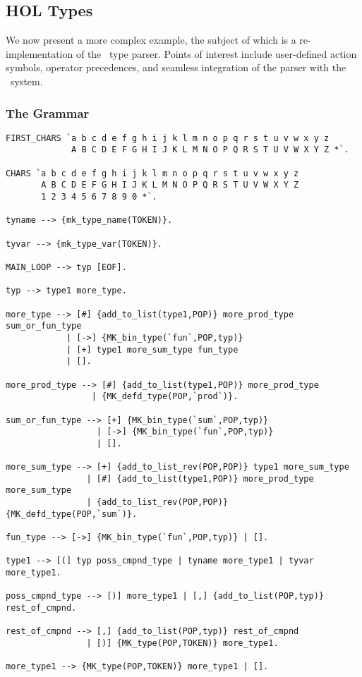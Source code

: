 \subsection{HOL Types}

We now present a more complex example, the subject of which is a 
re-implementation of the \HOL\ type parser.  Points of interest include
user-defined action symbols,
operator precedences,
and seamless integration of the parser with the \HOL\ system.

\subsubsection{The Grammar}

\begin{center}
\begin{boxed}
\begin{verbatim}
FIRST_CHARS `a b c d e f g h i j k l m n o p q r s t u v w x y z 
             A B C D E F G H I J K L M N O P Q R S T U V W X Y Z *`.

CHARS `a b c d e f g h i j k l m n o p q r s t u v w x y z 
       A B C D E F G H I J K L M N O P Q R S T U V W X Y Z 
       1 2 3 4 5 6 7 8 9 0 *`.

tyname --> {mk_type_name(TOKEN)}.

tyvar --> {mk_type_var(TOKEN)}.

MAIN_LOOP --> typ [EOF].

typ --> type1 more_type.

more_type --> [#] {add_to_list(type1,POP)} more_prod_type sum_or_fun_type
            | [->] {MK_bin_type(`fun`,POP,typ)}
            | [+] type1 more_sum_type fun_type
            | [].

more_prod_type --> [#] {add_to_list(type1,POP)} more_prod_type
                 | {MK_defd_type(POP,`prod`)}.

sum_or_fun_type --> [+] {MK_bin_type(`sum`,POP,typ)}
                  | [->] {MK_bin_type(`fun`,POP,typ)}
                  | [].

more_sum_type --> [+] {add_to_list_rev(POP,POP)} type1 more_sum_type
                | [#] {add_to_list(type1,POP)} more_prod_type more_sum_type
                | {add_to_list_rev(POP,POP)} {MK_defd_type(POP,`sum`)}.

fun_type --> [->] {MK_bin_type(`fun`,POP,typ)} | [].

type1 --> [(] typ poss_cmpnd_type | tyname more_type1 | tyvar more_type1.

poss_cmpnd_type --> [)] more_type1 | [,] {add_to_list(POP,typ)} rest_of_cmpnd.

rest_of_cmpnd --> [,] {add_to_list(POP,typ)} rest_of_cmpnd
                | [)] {MK_type(POP,TOKEN)} more_type1.

more_type1 --> {MK_type(POP,TOKEN)} more_type1 | [].
\end{verbatim}
\end{boxed}
\end{center}

